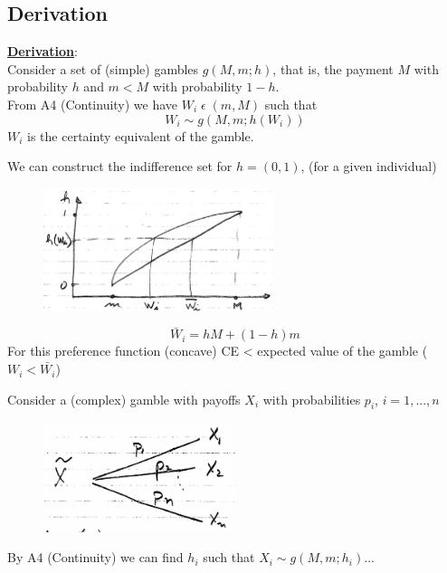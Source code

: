 \documentclass[
14pt,notheorems,hyperref={pdfauthor=whatever}
]{beamer}
\begin{document}
\subsection{Derivation}

\begin{frame}
\underline{\textbf{Derivation}}:\\
\hfill \break
Consider a set of (simple) gambles $g(M,m;h)$, that is, the payment $M$ with probability $h$ and $m<M$ with probability $1-h$.\\
From A4 (Continuity) we have $W_i\;\epsilon\;(m,M)$ such that\\
\[W_i \sim g(M,m;h(W_i))\]
\hfill \break
$W_i$ is the certainty equivalent of the gamble.
\end{frame}

\begin{frame}
We can construct the indifference set for $h=(0,1)$, (for a given individual)\\
\begin{figure}[indiff-set]
    \includegraphics[width=0.6\textwidth]{L2-indiffset}
    \centering
\end{figure}
\[\bar{W}_i = hM+(1-h)m\]
For this preference function (concave) CE < expected value of the gamble ($W_i<\bar{W_i}$)
\end{frame}

\begin{frame}
Consider a (complex) gamble with payoffs $X_i$ with probabilities $p_i$, $i=1,...,n$\\
\begin{figure}[complex-gamble]
    \includegraphics[width=0.5\textwidth]{L2-complex-gamble}
    \centering
\end{figure}
By A4 (Continuity) we can find $h_i$ such that $X_i \sim g(M,m;h_i)$...
\end{frame}
\end{document}
